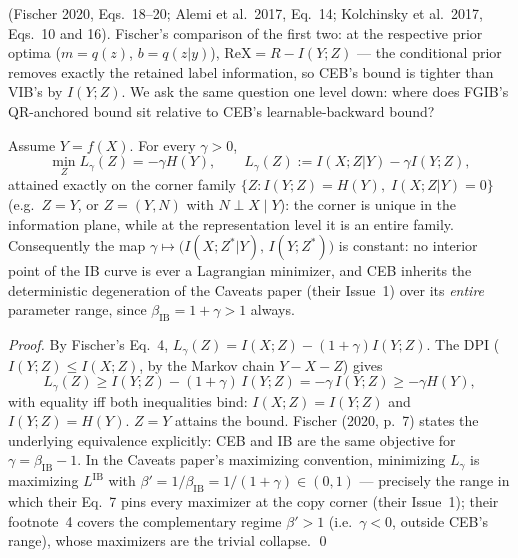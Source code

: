 (Fischer 2020, Eqs.~18--20; Alemi et al.\ 2017, Eq.~14; Kolchinsky et al.\ 2017,
Eqs.~10 and 16). Fischer's comparison of the first two: at the respective prior optima
($m = q(z)$, $b = q(z|y)$), $\mathrm{ReX} = R - I(Y;Z)$ --- the conditional prior removes
exactly the retained label information, so CEB's bound is tighter than VIB's by
$I(Y;Z)$. We ask the same question one level down: where does FGIB's QR-anchored bound
sit relative to CEB's learnable-backward bound?

\begin{proposition}\label{prop:dead}
Assume $Y = f(X)$. For every $\gamma > 0$,
\begin{equation}
\min_Z L_\gamma(Z) = -\gamma H(Y),
\qquad
L_\gamma(Z) := I(X;Z|Y) - \gamma I(Y;Z),
\label{eq:min}
\end{equation}
attained exactly on the corner family
$\{Z : I(Y;Z) = H(Y),\; I(X;Z|Y) = 0\}$ (e.g.\ $Z = Y$, or $Z = (Y, N)$ with
$N \perp X \mid Y$): the corner is unique in the information plane, while at the
representation level it is an entire family. Consequently the map
$\gamma \mapsto \big(I(X;Z^*|Y),\, I(Y;Z^*)\big)$ is constant: no interior point of the
IB curve is ever a Lagrangian minimizer, and CEB inherits the deterministic degeneration
of the Caveats paper (their Issue~1) over its \emph{entire} parameter range, since
$\beta_{\mathrm{IB}} = 1 + \gamma > 1$ always.
\end{proposition}

\begin{proof}
By Fischer's Eq.~4, $L_\gamma(Z) = I(X;Z) - (1+\gamma)I(Y;Z)$. The DPI
($I(Y;Z) \le I(X;Z)$, by the Markov chain $Y - X - Z$) gives
\begin{equation}
L_\gamma(Z) \ge I(Y;Z) - (1+\gamma)\,I(Y;Z)
= -\gamma\,I(Y;Z) \ge -\gamma H(Y),
\label{eq:chain}
\end{equation}
with equality iff both inequalities bind: $I(X;Z) = I(Y;Z)$ and $I(Y;Z) = H(Y)$.
$Z = Y$ attains the bound. Fischer (2020, p.~7) states the underlying equivalence
explicitly: CEB and IB are the same objective for $\gamma = \beta_{\mathrm{IB}} - 1$.
In the Caveats paper's maximizing convention, minimizing $L_\gamma$ is maximizing
$L^{\mathrm{IB}}$ with $\beta' = 1/\beta_{\mathrm{IB}} = 1/(1+\gamma) \in (0,1)$ ---
precisely the range in which their Eq.~7 pins every maximizer at the copy corner (their
Issue~1); their footnote~4 covers the complementary regime $\beta' > 1$ (i.e.\
$\gamma < 0$, outside CEB's range), whose maximizers are the trivial collapse. \hfill\qed
\end{proof}

